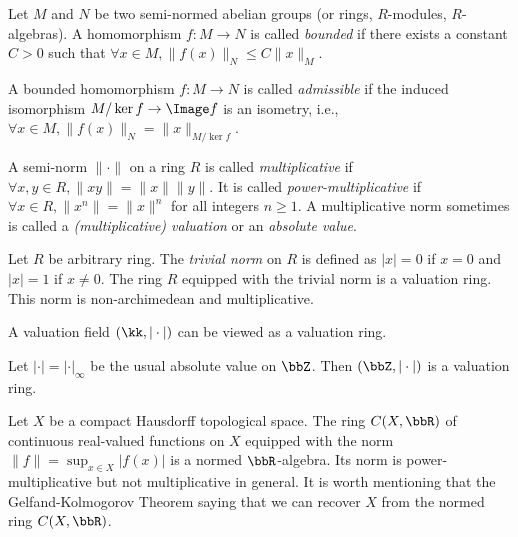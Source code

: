     \begin{definition}\label{def:bounded_and_admissible_homomorphism}
        Let \(M\) and \(N\) be two semi-normed abelian groups (or rings, \(R\)-modules, \(R\)-algebras).
        A homomorphism \(f: M \to N\) is called \emph{bounded} if there exists a constant \(C > 0\) such that \(\forall x \in M, \|f(x)\|_N \leq C\|x\|_M\).
        
        A bounded homomorphism \(f: M \to N\) is called \emph{admissible} if the induced isomorphism \(M/\ker f \to \Image f\) is an isometry, i.e., \(\forall x \in M, \|f(x)\|_N = \|x\|_{M/\ker f}\).
    \end{definition}

    \begin{definition}\label{def:multiplicative_and_power_multiplicative_semi-norm}
        A semi-norm \(\|\cdot\|\) on a ring \(R\) is called \emph{multiplicative} if \(\forall x,y \in R, \|xy\| = \|x\|\|y\|\).
        It is called \emph{power-multiplicative} if \(\forall x \in R, \|x^n\| = \|x\|^n\) for all integers \(n \geq 1\).
        A multiplicative norm sometimes is called a \emph{(multiplicative) valuation} or an \emph{absolute value}.
    \end{definition}

    \begin{example}\label{eg:trivial_normed_rings}
        Let \(R\) be arbitrary ring.
        The \emph{trivial norm} on \(R\) is defined as \(|x| = 0\) if \(x = 0\) and \(|x| = 1\) if \(x \neq 0\).
        The ring \(R\) equipped with the trivial norm is a valuation ring.
        This norm is non-archimedean and multiplicative.
    \end{example}

    \begin{example}\label{eg:valuation_rings_as_normed_rings}
        A valuation field \((\kk, |\cdot|)\) can be viewed as a valuation ring.
    \end{example}

    \begin{example}\label{eg:Z_with_usual_absolute_value_as_normed_rings}
        Let \(|\cdot| = |\cdot|_{\infty}\) be the usual absolute value on \(\bbZ\).
        Then \((\bbZ, |\cdot|)\) is a valuation ring.
    \end{example}

    \begin{example}\label{eg:ring_of_continuous_function_as_normed_rings}
        Let \(X\) be a compact Hausdorff topological space.
        The ring \(C(X, \bbR)\) of continuous real-valued functions on \(X\) equipped with the norm \(\|f\| = \sup_{x \in X} |f(x)|\) is a normed \(\bbR\)-algebra.
        Its norm is power-multiplicative but not multiplicative in general.
        It is worth mentioning that the Gelfand-Kolmogorov Theorem saying that we can recover \(X\) from the normed ring \(C(X, \bbR)\).
    \end{example}

